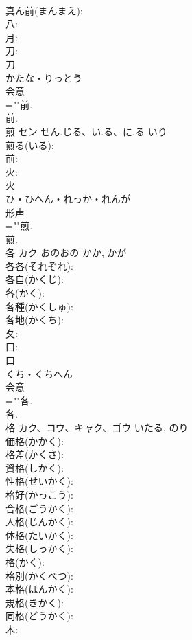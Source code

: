 \documentclass[8pt]{extreport}
\begin{document}
\begin{CJK}{UTF8}{min}
\\	真ん前(まんまえ): 
\\	八: 
\\	月: 
\\	刀: 
\\	刀	
\\	かたな・りっとう	
\\	会意 
\\	=""前.
\\	前.
\\	煎	セン	せん.じる、い.る、に.る	いり	
\\	煎る(いる): 
\\	前: 
\\	火: 
\\	火	
\\	ひ・ひへん・れっか・れんが	
\\	形声 
\\	=""煎.
\\	煎.
\\	各	カク	おのおの	かか, かが	
\\	各各(それぞれ): 
\\	各自(かくじ): 
\\	各(かく): 
\\	各種(かくしゅ): 
\\	各地(かくち): 
\\	夂: 
\\	口: 
\\	口	
\\	くち・くちへん	
\\	会意 
\\	=""各.
\\	各.
\\	格	カク、コウ、キャク、ゴウ		いたる, のり	
\\	価格(かかく): 
\\	格差(かくさ): 
\\	資格(しかく): 
\\	性格(せいかく): 
\\	格好(かっこう): 
\\	合格(ごうかく): 
\\	人格(じんかく): 
\\	体格(たいかく): 
\\	失格(しっかく): 
\\	格(かく): 
\\	格別(かくべつ): 
\\	本格(ほんかく): 
\\	規格(きかく): 
\\	同格(どうかく): 
\\	木: 

\end{CJK}
\end{document}
